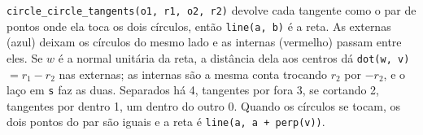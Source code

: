 \texttt{circle\_circle\_tangents(o1, r1, o2, r2)} devolve cada tangente como o par de pontos onde ela toca os dois
círculos, então \texttt{line(a, b)} é a reta. As externas (azul) deixam os círculos do mesmo lado e as internas
(vermelho) passam entre eles. Se $w$ é a normal unitária da reta, a distância dela aos centros dá
\texttt{dot(w, v)} $= r_1 - r_2$ nas externas; as internas são a mesma conta trocando $r_2$ por $-r_2$, e o laço em
\texttt{s} faz as duas. Separados há 4, tangentes por fora 3, se cortando 2, tangentes por dentro 1, um dentro do
outro 0. Quando os círculos se tocam, os dois pontos do par são iguais e a reta é \texttt{line(a, a + perp(v))}.
